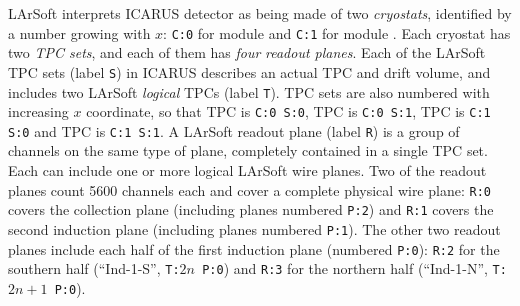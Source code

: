 LArSoft interprets ICARUS detector as being made of two \emph{cryostats},
identified by a number growing with $x$:
\texttt{C:0} for module  and \texttt{C:1} for module .
Each cryostat has two \emph{TPC sets}, and each of them has \emph{four}
\emph{readout planes}.
Each of the LArSoft TPC sets (label \texttt{S}) in ICARUS describes an actual TPC and drift
volume, and includes two LArSoft \emph{logical} TPCs (label \texttt{T}).
TPC sets are also numbered with increasing $x$ coordinate, so that
TPC  is \texttt{C:0 S:0}, TPC  is \texttt{C:0 S:1},
TPC  is \texttt{C:1 S:0} and TPC  is \texttt{C:1 S:1}.
A LArSoft readout plane (label \texttt{R}) is a group of channels on the same type of plane,
completely contained in a single TPC set.
Each can include one or more logical LArSoft wire planes.
Two of the readout planes count 5600 channels each and cover a complete physical wire
plane: \texttt{R:0} covers the collection plane (including planes numbered \texttt{P:2})
and \texttt{R:1} covers the second induction plane (including planes numbered \texttt{P:1}).
The other two readout planes include each half of the first induction plane (numbered \texttt{P:0}):
\texttt{R:2} for the southern half (``Ind-1-S'', \texttt{T:$2n$ P:0})
and \texttt{R:3} for the northern half (``Ind-1-N'', \texttt{T:$2n+1$ P:0}).

